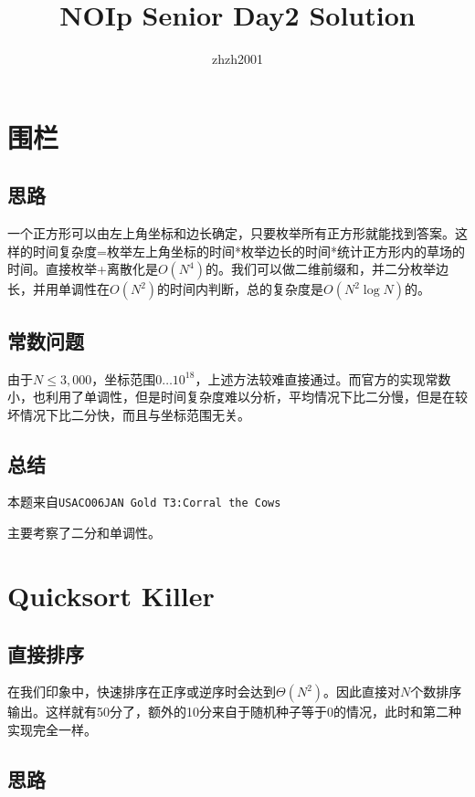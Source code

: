 \documentclass[hyperref,UTF8,12pt,a4paper]{ctexart}
\title{NOIp Senior Day2 Solution}
\author{zhzh2001}
\date{}
\begin{document}
\maketitle

\section{围栏}

\subsection{思路}

一个正方形可以由左上角坐标和边长确定，只要枚举所有正方形就能找到答案。这样的时间复杂度=枚举左上角坐标的时间*枚举边长的时间*统计正方形内的草场的时间。直接枚举+离散化是$O(N^4)$的。我们可以做二维前缀和，并二分枚举边长，并用单调性在$O(N^2)$的时间内判断，总的复杂度是$O(N^2\log N)$的。

\subsection{常数问题}

由于$N\le3,000$，坐标范围$0\dots10^{18}$，上述方法较难直接通过。而官方的实现常数小，也利用了单调性，但是时间复杂度难以分析，平均情况下比二分慢，但是在较坏情况下比二分快，而且与坐标范围无关。

\subsection{总结}

本题来自\verb|USACO06JAN Gold T3:Corral the Cows|

主要考察了二分和单调性。

\section{Quicksort Killer}

\subsection{直接排序}

在我们印象中，快速排序在正序或逆序时会达到$\Theta(N^2)$。因此直接对$N$个数排序输出。这样就有50分了，额外的10分来自于随机种子等于0的情况，此时和第二种实现完全一样。

\subsection{思路}
\end{document}
